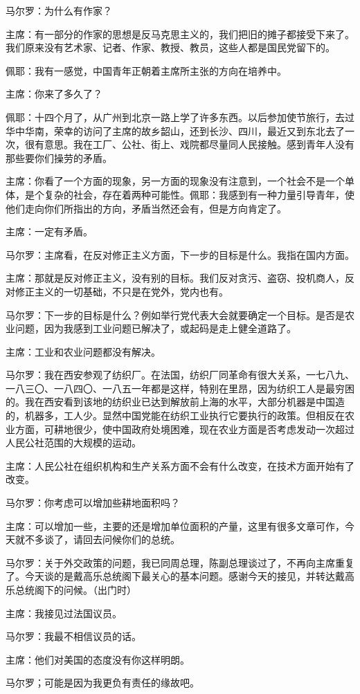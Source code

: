 马尔罗：为什么有作家？

主席：有一部分的作家的思想是反马克思主义的，我们把旧的摊子都接受下来了。我们原来没有艺术家、记者、作家、教授、教员，这些人都是国民党留下的。

佩耶：我有一感觉，中国青年正朝着主席所主张的方向在培养中。

主席：你来了多久了？

佩耶：十四个月了，从广州到北京一路上学了许多东西。以后参加使节旅行，去过华中华南，荣幸的访问了主席的故乡韶山，还到长沙、四川，最近又到东北去了一次，很有意思。我在工厂、公社、街上、戏院都尽量同人民接触。感到青年人没有那些要你们操劳的矛盾。

主席：你看了一个方面的现象，另一方面的现象没有注意到，一个社会不是一个单体，是个复杂的社会，存在着两种可能性。佩耶：我感到有一种力量引导青年，使他们走向你们所指出的方向，矛盾当然还会有，但是方向肯定了。

主席：一定有矛盾。

马尔罗：主席看，在反对修正主义方面，下一步的目标是什么。我指在国内方面。

主席：那就是反对修正主义，没有别的目标。我们反对贪污、盗窃、投机商人，反对修正主义的一切基础，不只是在党外，党内也有。

马尔罗：下一步的目标是什么？例如举行党代表大会就要确定一个目标。是否是农业问题，因为我感到工业问题已解决了，或起码是走上健全道路了。

主席：工业和农业问题都没有解决。

马尔罗：我在西安参观了纺织厂。在法国，纺织厂同革命有很大关系，一七八九、一八三〇、一八四〇、一八五一年都是这样，特别在里昂，因为纺织工人是最穷困的。我在西安看到该地的纺织业已达到解放前上海的水平，大部分机器是中国造的，机器多，工人少。显然中国党能在纺织工业执行它要执行的政策。但相反在农业方面，可耕地很少，使中国政府处境困难，现在农业方面是否考虑发动一次超过人民公社范围的大规模的运动。

主席：人民公社在组织机构和生产关系方面不会有什么改变，在技术方面开始有了改变。

马尔罗：你考虑可以增加些耕地面积吗？

主席：可以增加一些，主要的还是增加单位面积的产量，这里有很多文章可作，今天就不多谈了，请回去问候你们的总统。

马尔罗：关于外交政策的问题，我已同周总理，陈副总理谈过了，不再向主席重复了。今天谈的是戴高乐总统阁下最关心的基本问题。感谢今天的接见，并转达戴高乐总统阁下的问候。（出门时）

主席：我接见过法国议员。

马尔罗：我最不相信议员的话。

主席：他们对美国的态度没有你这样明朗。

马尔罗；可能是因为我更负有责任的缘故吧。

